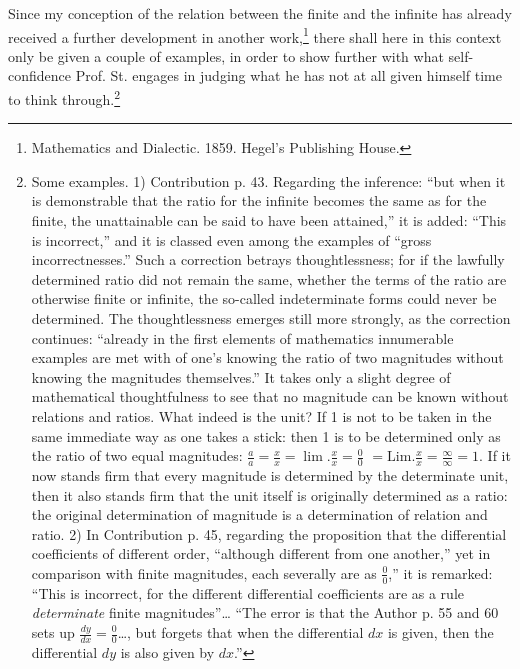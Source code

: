 \documentclass[12pt,a4paper,openany]{book}
\newcommand{\opage}[1]{\marginnote{\footnotesize\textit{[#1]}}}
\begin{document}
Since my conception of the relation between the finite
and the infinite has already received a further development in
another work,\footnote{Mathematics and Dialectic. 1859. Hegel's Publishing House.} there shall here in this context only
\opage{42}\setcounter{footnote}{0}%
be given a couple of examples, in order to show further
with what self-confidence Prof. St. engages in
judging what he has not at all given himself time to
think through.\footnote{Some examples. 1) Contribution p. 43. Regarding the inference:
``but when it is demonstrable that the ratio for the infinite becomes the same as for the finite, the unattainable can be said
to have been attained,'' it is added: ``This is incorrect,'' and it is classed
even among the examples of ``gross incorrectnesses.'' Such a
correction betrays thoughtlessness; for if the lawfully determined ratio did not remain the same, %
whether the terms of the ratio are otherwise
finite or infinite, the so-called indeterminate forms could never be
determined. The thoughtlessness emerges still more strongly,
as the correction continues: ``already in the first elements of mathematics innumerable examples are met with of one's knowing the ratio of two magnitudes without knowing the magnitudes themselves.'' It takes
only a slight degree of mathematical thoughtfulness to see that
no magnitude can be known without relations and ratios.
What indeed is the unit? If 1 is not to be taken in the same immediate way as one takes a stick: then 1 is to be determined only
as the ratio of two equal magnitudes: $\frac{a}{a} = \frac{x}{x} = \lim. \frac{x}{x} = \frac{0}{0}$
$= \mathrm{Lim.} \frac{x}{x} = \frac{\infty}{\infty} = 1.$ If it now stands firm that every magnitude
is determined by the determinate unit, then it also stands firm that
the unit itself is originally determined as a ratio: the original determination of magnitude is a determination of relation and ratio. 2) In Contribution p. 45, regarding the proposition that the differential coefficients of different order, ``although %
different from one another,'' yet in comparison with
finite magnitudes, each severally are as $\frac{0}{0}$,'' it is remarked: ``This is
incorrect, for the different differential coefficients are as a rule
\emph{determinate} finite magnitudes''\dots{} ``The error is that the Author p. 55
and 60 sets up $\frac{dy}{dx} = \frac{0}{0}$\dots{}, but forgets that when the differential $dx$ is given, then the differential $dy$ is also given by $dx$.''
}
\end{document}
